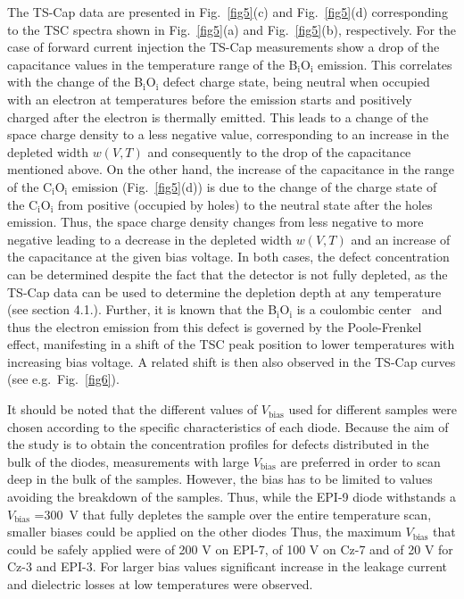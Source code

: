 \documentclass[final, 5p, times]{elsarticle}
\begin{document}
The TS-Cap data are presented in Fig.~\ref{fig5}(c) and Fig.~\ref{fig5}(d) corresponding to the TSC spectra shown in Fig.~\ref{fig5}(a) and Fig.~\ref{fig5}(b), respectively. For the case of forward current injection the TS-Cap measurements show a drop of the capacitance values in the temperature range of the B$_\text{i}$O$_\text{i}$ emission. This correlates with the change of the B$_\text{i}$O$_\text{i}$ defect charge state, being neutral when occupied with an electron at temperatures before the emission starts and positively charged after the electron is thermally emitted. This leads to a change of the space charge density to a less negative value, corresponding to an increase in the depleted width $w(V,T)$ and consequently to the drop of the capacitance mentioned above. On the other hand, the increase of the capacitance in the range of the C$_\text{i}$O$_\text{i}$ emission (Fig.~\ref{fig5}(d)) is due to the change of the charge state of the C$_\text{i}$O$_\text{i}$ from positive (occupied by holes) to the neutral state after the holes emission. Thus, the space charge density changes from less negative to more negative leading to a decrease in the depleted width $w(V,T)$ and an increase of the capacitance at the given bias voltage. In both cases, the defect concentration can be determined despite the fact that the detector is not fully depleted, as the TS-Cap data can be used to determine the depletion depth at any temperature (see section 4.1.). Further, it is known that the B$_\text{i}$O$_\text{i}$ is a coulombic center~\cite{b30,b31} and thus the electron emission from this defect is governed by the Poole-Frenkel effect, manifesting in a shift of the TSC peak position to lower temperatures with increasing bias voltage. A related shift is then also observed in the TS-Cap curves (see e.g.\ Fig.~\ref{fig6}).
\par
It should be noted that the different values of $V_\text{bias}$ used for different samples were chosen according to the specific characteristics of each diode. Because the aim of the study is to obtain the concentration profiles for defects distributed in the bulk of the diodes, measurements with large $V_\text{bias}$ are preferred in order to scan deep in the bulk of the samples. However, the bias has to be limited to values avoiding the breakdown of the samples. Thus, while the EPI-9 diode withstands a $V_\text{bias}$ =300~V that fully depletes the sample over the entire temperature scan, smaller biases could be applied on the other diodes Thus, the maximum $V_\text{bias}$ that could be safely applied were of 200 V on EPI-7, of 100 V on Cz-7 and of 20 V for Cz-3 and EPI-3. For larger bias values significant increase in the leakage current and dielectric losses at low temperatures were observed.
\end{document}
